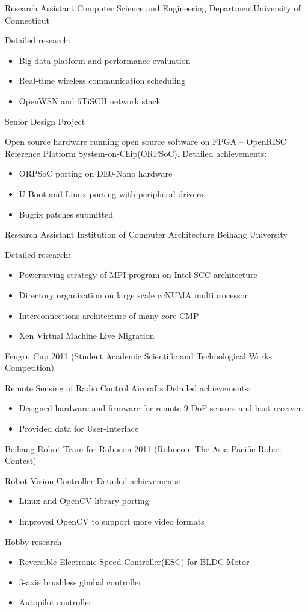 {Research Assistant}
{Computer Science and Engineering Department}{University of Connecticut}{}{
Detailed research:
\begin{itemize}
	\item Big-data platform and performance evaluation\cite{rtssdemo}
	\item Real-time wireless communication scheduling\cite{ecrts}
	\item OpenWSN and 6TiSCH network stack
\end{itemize}
}
{Senior Design Project}
{}{}{}{
Open source hardware running open source software on FPGA -- OpenRISC Reference Platform System-on-Chip(ORPSoC).\newline{}
Detailed achievements:
\begin{itemize}
	\item ORPSoC porting on DE0-Nano hardware
	\item U-Boot and Linux porting with peripheral drivers.
	\item Bugfix patches submitted
\end{itemize}
}
{Research Assistant}
{Institution of Computer Architecture}
{Beihang University}{}{
Detailed research:
\begin{itemize}
	\item Powersaving strategy of MPI program on Intel SCC architecture
	\item Directory organization on large scale ccNUMA multiprocessor	
	\item Interconnections architecture of many-core CMP\cite{xtorus}
	\item Xen Virtual Machine Live Migration\cite{xen1,xen2}
\end{itemize}
}
{Fengru Cup 2011}
{(Student Academic Scientific and Technological Works Competition)}
{}{}{
Remote Sensing of Radio Control Aircrafts\newline{}
Detailed achievements:
\begin{itemize}
	\item Designed hardware and firmware for remote 9-DoF sensors and host receiver.
	\item Provided data for User-Interface
\end{itemize}
}
{Beihang Robot Team for Robocon 2011}
{(Robocon: The Asia-Pacific Robot Contest)}{}{}{
Robot Vision Controller\newline{}
Detailed achievements:
\begin{itemize}
	\item Linux and OpenCV library porting
	\item Improved OpenCV to support more video formats
\end{itemize}
}
\cventry{-}
{Hobby research}
{}{}{}{
\begin{itemize}
	\item Reversible Electronic-Speed-Controller(ESC) for BLDC Motor
	\item 3-axis brushless gimbal controller
	\item Autopilot controller
\end{itemize}
}
